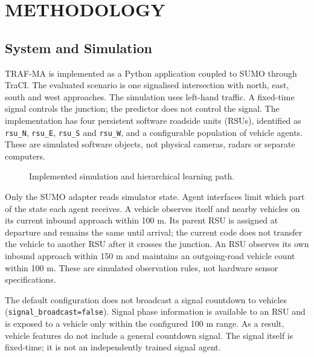 \chapter{METHODOLOGY}\label{ch:method}

\section{System and Simulation}
TRAF-MA is implemented as a Python application coupled to SUMO through TraCI. The evaluated scenario is one signalised intersection with north, east, south and west approaches. The simulation uses left-hand traffic. A fixed-time signal controls the junction; the predictor does not control the signal. The implementation has four persistent software roadside units (RSUs), identified as \texttt{rsu\_N}, \texttt{rsu\_E}, \texttt{rsu\_S} and \texttt{rsu\_W}, and a configurable population of vehicle agents. These are simulated software objects, not physical cameras, radars or separate computers.

\begin{figure}[ht]
\centering
{}
\caption{Implemented simulation and hierarchical learning path.}
\label{fig:implemented-flow}
\end{figure}

Only the SUMO adapter reads simulator state. Agent interfaces limit which part of the state each agent receives. A vehicle observes itself and nearby vehicles on its current inbound approach within 100 m. Its parent RSU is assigned at departure and remains the same until arrival; the current code does not transfer the vehicle to another RSU after it crosses the junction. An RSU observes its own inbound approach within 150 m and maintains an outgoing-road vehicle count within 100 m. These are simulated observation rules, not hardware sensor specifications.

The default configuration does not broadcast a signal countdown to vehicles (\texttt{signal\_broadcast=false}). Signal phase information is available to an RSU and is exposed to a vehicle only within the configured 100 m range. As a result, vehicle features do not include a general countdown signal. The signal itself is fixed-time; it is not an independently trained signal agent.

